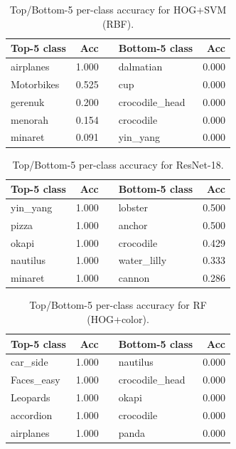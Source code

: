 \documentclass[11pt]{article}
\begin{document}
\begin{table}[h]
  \centering
  \begin{tabular}{l r c l r}
    \toprule
    \textbf{Top-5 class} & \textbf{Acc} & & \textbf{Bottom-5 class} & \textbf{Acc}\\
    \midrule
    airplanes & 1.000 & & dalmatian & 0.000\\
    Motorbikes & 0.525 & & cup & 0.000\\
    gerenuk & 0.200 & & crocodile\_head & 0.000\\
    menorah & 0.154 & & crocodile & 0.000\\
    minaret & 0.091 & & yin\_yang & 0.000\\
    \bottomrule
  \end{tabular}
  \caption{Top/Bottom-5 per-class accuracy for HOG+SVM (RBF).}
  \label{tab:perclass_hog_svm_rbf}
\end{table}

\begin{table}[h]
  \centering
  \begin{tabular}{l r c l r}
    \toprule
    \textbf{Top-5 class} & \textbf{Acc} & & \textbf{Bottom-5 class} & \textbf{Acc}\\
    \midrule
    yin\_yang & 1.000 & & lobster & 0.500\\
    pizza & 1.000 & & anchor & 0.500\\
    okapi & 1.000 & & crocodile & 0.429\\
    nautilus & 1.000 & & water\_lilly & 0.333\\
    minaret & 1.000 & & cannon & 0.286\\
    \bottomrule
  \end{tabular}
  \caption{Top/Bottom-5 per-class accuracy for ResNet-18.}
  \label{tab:perclass_resnet18_224_sgd_cosine_ls01}
\end{table}

\begin{table}[H]
  \centering
  \begin{tabular}{l r c l r}
    \toprule
    \textbf{Top-5 class} & \textbf{Acc} & & \textbf{Bottom-5 class} & \textbf{Acc}\\
    \midrule
    car\_side & 1.000 & & nautilus & 0.000\\
    Faces\_easy & 1.000 & & crocodile\_head & 0.000\\
    Leopards & 1.000 & & okapi & 0.000\\
    accordion & 1.000 & & crocodile & 0.000\\
    airplanes & 1.000 & & panda & 0.000\\
    \bottomrule
  \end{tabular}
  \caption{Top/Bottom-5 per-class accuracy for RF (HOG+color).}
  \label{tab:perclass_rf_hog_color_128px}
\end{table}
\end{document}
